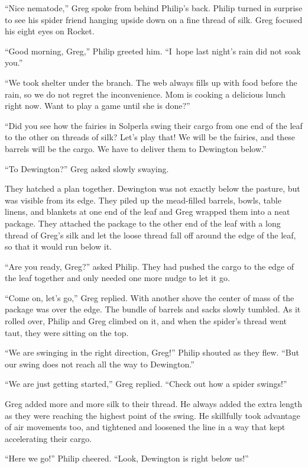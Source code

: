 \documentclass[10pt]{memoir}
\begin{document}
``Nice nematode,'' Greg spoke from behind Philip's back. Philip turned in
surprise to see his spider friend hanging upside down on a fine thread of silk.
Greg focused his eight eyes on Rocket.

``Good morning, Greg,'' Philip greeted him. ``I~hope last night's rain did not
soak you.''

``We took shelter under the branch. The web always fills up with food before
the rain, so we do not regret the inconvenience. Mom is cooking a delicious
lunch right now. Want to play a game until she is done?''

``Did you see how the fairies in Solperla swing their cargo from one end of the
leaf to the other on threads of silk? Let's play that! We will be the fairies,
and these barrels will be the cargo. We have to deliver them to Dewington
below.''

``To Dewington?'' Greg asked slowly swaying.

They hatched a plan together. Dewington was not exactly below the pasture, but
was visible from its edge. They piled up the mead-filled barrels, bowls, table
linens, and blankets at one end of the leaf and Greg wrapped them into a neat
package. They attached the package to the other end of the leaf with a long
thread of Greg's silk and let the loose thread fall off around the edge of the
leaf, so that it would run below it.

``Are you ready, Greg?'' asked Philip. They had pushed the cargo to the edge of
the leaf together and only needed one more nudge to let it go.

``Come on, let's go,'' Greg replied. With another shove the center of mass of
the package was over the edge. The bundle of barrels and sacks slowly tumbled.
As it rolled over, Philip and Greg climbed on it, and when the spider's thread
went taut, they were sitting on the top.

``We are swinging in the right direction, Greg!'' Philip shouted as they flew.
``But our swing does not reach all the way to Dewington.''

``We are just getting started,'' Greg replied. ``Check out how a spider
swings!''

Greg added more and more silk to their thread. He always added the extra length
as they were reaching the highest point of the swing. He skillfully took
advantage of air movements too, and tightened and loosened the line in a way
that kept accelerating their cargo.

``Here we go!'' Philip cheered. ``Look, Dewington is right below us!''
\end{document}
